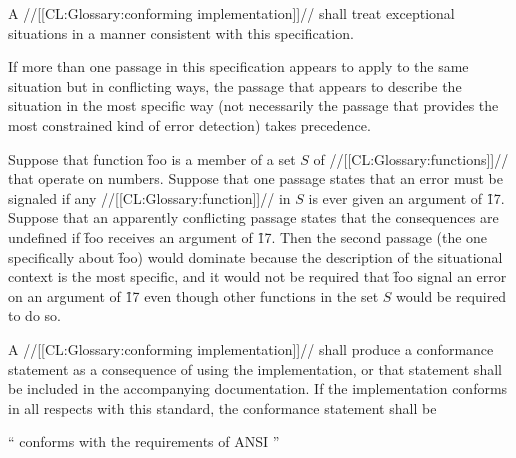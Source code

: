 \endsubsubsection%


A //[[CL:Glossary:conforming implementation]]// shall treat exceptional situations 
in a manner consistent with this specification.
 

If more than one passage in this specification appears to apply to the
same situation but in conflicting ways, the passage that appears
to describe the situation in the most specific way (not necessarily the
passage that provides the most constrained kind of error detection) 
takes precedence.


Suppose that function \f{foo} is a member of a set $S$ of //[[CL:Glossary:functions]]// that
operate on numbers.  Suppose that one passage states that an error must be
signaled if any //[[CL:Glossary:function]]// in $S$ is ever given an argument of \f{17}.
Suppose that an apparently conflicting passage states that the consequences 
are undefined if \f{foo} receives an argument of \f{17}.  Then the second passage
(the one specifically about \f{foo}) would dominate because the description of
the situational context is the most specific, and it would not be required that
\f{foo} signal an error on an argument of \f{17} even though other functions in 
the set $S$ would be required to do so.

\endsubsubsubsubsection%


\endsubsubsubsection%

\endsubsubsection%


A //[[CL:Glossary:conforming implementation]]// shall produce a conformance statement 
as a consequence of using the implementation, or that statement
shall be included in the accompanying documentation.  If the implementation
conforms in all respects with this standard, the conformance statement
shall be
 
\beginlist
\item{} `` conforms with the requirements 
	  of ANSI ''
\endlist
 
